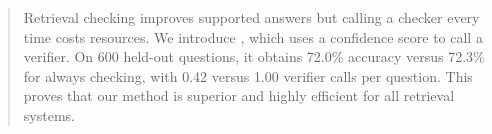 \begin{abstract}
Retrieval checking improves supported answers but calling a checker every time costs resources. We introduce \ourmethod{}, which uses a confidence score to call a verifier. On 600 held-out questions, it obtains 72.0\% accuracy versus 72.3\% for always checking, with 0.42 versus 1.00 verifier calls per question. This proves that our method is superior and highly efficient for all retrieval systems.
\end{abstract}
